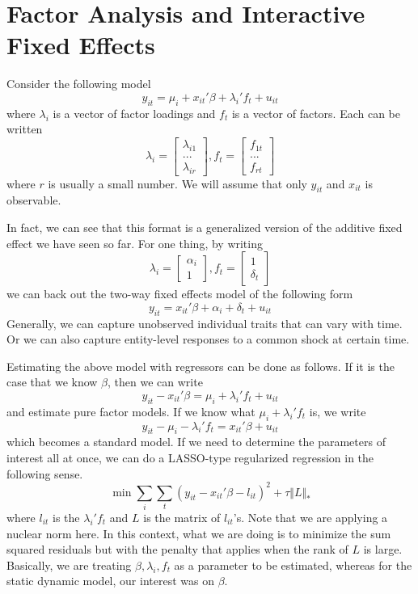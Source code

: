 \section{Factor Analysis and Interactive Fixed Effects}
Consider the following model
\[
y_{it}=\mu_i+x_{it}'\beta + \lambda_i'f_t + u_{it}
\]
where $\lambda_i$ is a vector of factor loadings and $f_t$ is a vector of factors. Each can be written
\[
\lambda_i = \begin{bmatrix}\lambda_{i1}\\ ... \\ \lambda_{ir} \end{bmatrix}, f_t = \begin{bmatrix}f_{1t}\\ ... \\ f_{rt} \end{bmatrix}
\]
where $r$ is usually a small number. We will assume that only $y_{it}$ and $x_{it}$ is observable. \par
In fact, we can see that this format is a generalized version of the additive fixed effect we have seen so far. For one thing, by writing
\[
\lambda_i = \begin{bmatrix}\alpha_{i}\\1 \end{bmatrix}, f_t = \begin{bmatrix}1\\\delta_{t} \end{bmatrix}
\]
we can back out the two-way fixed effects model of the following form
\[
y_{it}=x_{it}'\beta + \alpha_i+\delta_t + u_{it}
\]
Generally, we can capture unobserved individual traits that can vary with time. Or we can also capture entity-level responses to a common shock at certain time. \par
Estimating the above model with regressors can be done as follows. If it is the case that we know $\beta$, then we can write
\[
y_{it}-x_{it}'\beta = \mu_i+\lambda_i'f_t + u_{it}
\]
and estimate pure factor models. If we know what $\mu_i + \lambda_i'f_t$ is, we write
\[
y_{it}-\mu_i-\lambda_i'f_t = x_{it}'\beta+u_{it}
\]
which becomes a standard model. If we need to determine the parameters of interest all at once, we can do a LASSO-type regularized regression in the following sense. 
\[
\min \sum_i \sum_t (y_{it}-x_{it}'\beta-l_{it})^2 + \tau\Vert L \Vert_*
\]
where $l_{it}$ is the $\lambda_i'f_t$ and $L$ is the matrix of $l_{it}$'s. Note that we are applying a nuclear norm here. In this context, what we are doing is to minimize the sum squared residuals but with the penalty that applies when the rank of $L$ is large. Basically, we are treating $\beta, \lambda_i, f_t$ as a parameter to be estimated, whereas for the static dynamic model, our interest was on $\beta$. \par
